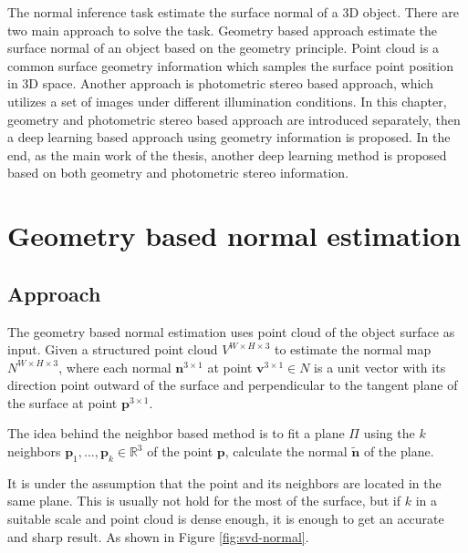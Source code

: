 \documentclass[border=15pt, multi, tikz]{article}
\begin{document}
	
	


The normal inference task estimate the surface normal of a 3D object. There are two main approach to solve the task. Geometry based approach estimate the surface normal of an object based on the geometry principle. Point cloud is a common surface geometry information which samples the surface point position in 3D space. Another approach is photometric stereo based approach, which utilizes a set of images under different illumination conditions. In this chapter, geometry and photometric stereo based approach are introduced separately, then a deep learning based approach using geometry information is proposed. In the end, as the main work of the thesis, another deep learning method is proposed based on both geometry and photometric stereo information.


\section{Geometry based normal estimation}

\subsection{Approach}
The geometry based normal estimation uses point cloud of the object surface as input.
Given a structured point cloud $ V^{W\times H\times 3} $ to estimate the normal map  $ N^{W\times H \times 3} $, where each normal  $ \textbf{n}^{3\times 1} $ at point $ \textbf{v}^{3\times 1} \in N $ is a unit vector with its direction point outward of the surface and perpendicular to the tangent plane of the surface at point $ \textbf{p}^{3\times 1} $.

The idea behind the neighbor based method is to fit a plane $ \Pi $ using the $ k $ neighbors $ \textbf{p}_1, ..., \textbf{p}_k \in \mathbb{R}^3 $ of the point $ \textbf{p} $, calculate the normal  $ \tilde{\textbf{n}} $ of the plane. 

It is under the assumption that the point and its neighbors are located in the same plane. This is usually not hold for the most of the surface, but if $ k $ in a suitable scale and point cloud is dense enough, it is enough to get an accurate and sharp result. As shown in Figure \ref{fig:svd-normal}. 
\end{document}
